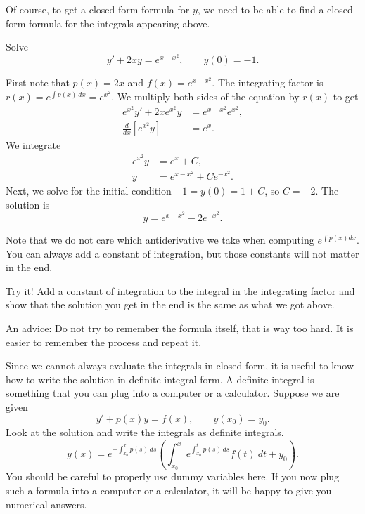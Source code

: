 \documentclass[12pt]{book}
\begin{document}
Of course, to get a closed form formula for $y$,
we need to be able to find a
closed form formula for the integrals appearing above.

\begin{example}
Solve
\begin{equation*}
y' + 2xy = e^{x-x^2}, \qquad y(0) = -1 .
\end{equation*}

First note that $p(x) = 2x$ and $f(x) = e^{x-x^2}$.
The integrating factor is $r(x) = e^{\int p(x)\, dx} = e^{x^2}$.
We multiply both sides of the equation by $r(x)$ to get
\begin{align*}
e^{x^2} y' + 2xe^{x^2}y & = e^{x-x^2} e^{x^2} , \\
\frac{d}{dx} \left[ e^{x^2} y \right] &= e^x .
\end{align*}
We integrate
\begin{align*}
e^{x^2} y &= e^x +C , \\
y &= e^{x-x^2} + C e^{-x^2} .
\end{align*}
Next, we solve for the initial condition $-1 = y(0) = 1 + C$, so $C=-2$.
The solution is
\begin{equation*}
y = e^{x-x^2} - 2 e^{-x^2} .
\end{equation*}
\end{example}

Note that we do not care which antiderivative we take when computing
$e^{\int p(x) dx}$.  You can always add a constant of integration,
but those constants
will not matter in the end.

\begin{exercise}
Try it!  Add a constant of integration to the integral in
the integrating factor and show that the solution you get in the end is the
same as what we got above.
\end{exercise}

An advice: Do not try to remember the formula itself, that is way too
hard.  It is easier to remember the process and repeat it.

Since we cannot always evaluate the integrals in closed form, it is useful to
know how to write the solution in definite integral form.  A definite
integral is something that
you can plug into a computer or a calculator.  Suppose we are given
\begin{equation*}
y' + p(x) y = f(x) , \qquad y(x_0) = y_0 .
\end{equation*}
Look at the solution and write the integrals
as definite integrals.
\begin{equation} \label{lei:defsol}
\boxed{
~~
y(x) = e^{-\int_{x_0}^x p(s)\, ds} \left( \int_{x_0}^x e^{\int_{x_0}^t p(s)\, ds}
f(t) ~dt + y_0 \right).
~~
}
\end{equation}
You should
be careful to properly use dummy variables here.  If you now plug such a
formula into a
computer or a calculator, it will be happy to give you numerical answers.
\end{document}
